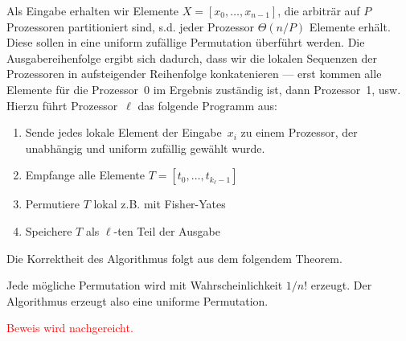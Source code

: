 Als Eingabe erhalten wir Elemente $X=[x_0, \ldots, x_{n-1}]$, die arbiträr auf $P$ Prozessoren partitioniert sind, s.d. jeder Prozessor $\Theta(n/P)$ Elemente erhält.
Diese sollen in eine uniform zufällige Permutation überführt werden.
Die Ausgabereihenfolge ergibt sich dadurch, dass wir die lokalen Sequenzen der Prozessoren in aufsteigender Reihenfolge konkatenieren ---
erst kommen alle Elemente für die Prozessor~0 im Ergebnis zuständig ist, dann Prozessor~1, usw.
Hierzu führt Prozessor~$\ell$ das folgende Programm aus:

\begin{enumerate}
    \item Sende jedes lokale Element der Eingabe~$x_i$ zu einem Prozessor, der unabhängig und uniform zufällig gewählt wurde.
    \item Empfange alle Elemente $T = [t_0, \ldots, t_{k_\ell-1}]$
          \iffalse\item Berechne die Präfixsumme $\Delta_\ell = \sum_{i=0}^{\ell - 1} k_i$.
          Der Wert $\Delta_\ell$ entspricht dann der Position des ersten Elements von Prozessor~$\ell$ in der Ausgabe.\fi
    \item Permutiere $T$ lokal z.B. mit Fisher-Yates
    \item Speichere $T$ als $\ell$-ten Teil der Ausgabe
\end{enumerate}

Die Korrektheit des Algorithmus folgt aus dem folgendem Theorem.

\begin{theorem}
    Jede mögliche Permutation wird mit Wahrscheinlichkeit $1/n!$ erzeugt.
    Der Algorithmus erzeugt also eine uniforme Permutation.
\end{theorem}

\noindent
\textcolor{red}{Beweis wird nachgereicht.}

